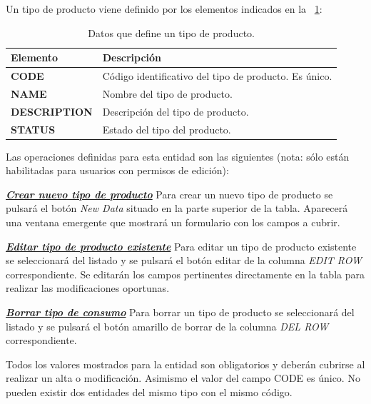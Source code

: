 Un tipo de producto viene definido por los elementos indicados en la \tablename~\ref{tab:tipo-producto}:



\begin{table}[H]
  \centering
  \setlength{\leftmargini}{0.4cm}
  \resizebox{14cm}{!} {
  \begin{tabular}{|m{3cm} m{11cm}|}
  \rowcolor{udcpink!25}
  \hline
  	\textbf{Elemento} & \textbf{Descripción} \\\hline
	\textbf{CODE} & Código identificativo del tipo de producto. Es único.   \\
	\textbf{NAME} & Nombre del tipo de producto. \\
	\textbf{DESCRIPTION} & Descripción del tipo de producto. \\		
	\textbf{STATUS} & Estado del tipo del producto.
	\\\hline
  \end{tabular}
  } %
  \caption{Datos que define un tipo de producto.}
  \label{tab:tipo-producto}
\end{table}

Las operaciones definidas para esta entidad son las siguientes (nota: sólo están habilitadas para usuarios con permisos de edición):

\underline{\textsl{\textbf{Crear nuevo tipo de producto}}}\newline
Para crear un nuevo tipo de producto se pulsará el botón \textit{New Data} situado en la parte superior de la tabla. Aparecerá una ventana emergente que mostrará un formulario con los campos a cubrir.

\underline{\textsl{\textbf{Editar tipo de producto existente}}}\newline
Para editar un tipo de producto existente se seleccionará del listado y se pulsará el botón editar de la columna \textit{EDIT ROW} correspondiente. Se editarán los campos pertinentes directamente en la tabla para realizar las modificaciones oportunas. 

\underline{\textsl{\textbf{Borrar tipo de consumo}}}\newline
Para borrar un tipo de producto se seleccionará del listado y se pulsará el botón amarillo de borrar de la columna \textit{DEL ROW} correspondiente.\newline

Todos los valores mostrados para la entidad son obligatorios y deberán cubrirse al realizar un alta o modificación. Asimismo el valor del campo CODE es único. No pueden existir dos entidades del mismo tipo con el mismo código.




